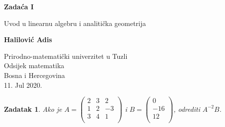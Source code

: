 \documentclass{article}
\newtheorem{theorem}{\textbf{Zadatak}}
\begin{document}
\begin{titlepage}
    \begin{center}
        \vspace*{1cm}

        \huge
        \textbf{Zada\' ca I}

        \vspace{0.5cm}
        \large
        Uvod u linearnu algebru i analiti\v cka geometrija
            
        \vspace{1.5cm}

        \textbf{Halilovi\' c Adis}

        \vfill
            
            
        \large
        Prirodno-matemati\v cki univerzitet u Tuzli\\
        Odsijek matematika\\
        Bosna i Hercegovina\\
        11. Jul 2020.
    \end{center}
\end{titlepage}

\begin{theorem}
    Ako je
        \(A=\left(
        \begin{array}{ccc}
            2 & 3 & 2 \\
            1 & 2 & -3 \\
            3 & 4 & 1 \\
        \end{array}
        \right)\)
    i
    \(B=\left(
    \begin{array}{c}
        0 \\
        -16 \\
        12 \\
    \end{array}
    \right)\),
    odrediti $A^{-2}B$.
\end{theorem}
\end{document}
